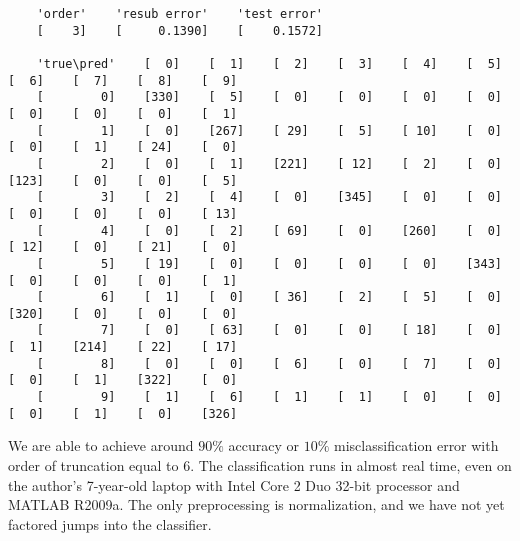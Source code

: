 \documentclass[fleqn]{article}
\theoremstyle{definition}
\theoremstyle{remark}
\begin{document}
\begin{verbatim}
    'order'    'resub error'    'test error'
    [    3]    [     0.1390]    [    0.1572]

    'true\pred'    [  0]    [  1]    [  2]    [  3]    [  4]    [  5]    [  6]    [  7]    [  8]    [  9]
    [        0]    [330]    [  5]    [  0]    [  0]    [  0]    [  0]    [  0]    [  0]    [  0]    [  1]
    [        1]    [  0]    [267]    [ 29]    [  5]    [ 10]    [  0]    [  0]    [  1]    [ 24]    [  0]
    [        2]    [  0]    [  1]    [221]    [ 12]    [  2]    [  0]    [123]    [  0]    [  0]    [  5]
    [        3]    [  2]    [  4]    [  0]    [345]    [  0]    [  0]    [  0]    [  0]    [  0]    [ 13]
    [        4]    [  0]    [  2]    [ 69]    [  0]    [260]    [  0]    [ 12]    [  0]    [ 21]    [  0]
    [        5]    [ 19]    [  0]    [  0]    [  0]    [  0]    [343]    [  0]    [  0]    [  0]    [  1]
    [        6]    [  1]    [  0]    [ 36]    [  2]    [  5]    [  0]    [320]    [  0]    [  0]    [  0]
    [        7]    [  0]    [ 63]    [  0]    [  0]    [ 18]    [  0]    [  1]    [214]    [ 22]    [ 17]
    [        8]    [  0]    [  0]    [  6]    [  0]    [  7]    [  0]    [  0]    [  1]    [322]    [  0]
    [        9]    [  1]    [  6]    [  1]    [  1]    [  0]    [  0]    [  0]    [  1]    [  0]    [326]
\end{verbatim}

We are able to achieve around $90\%$ accuracy or $10\%$ misclassification error with order of truncation equal to 6. The classification runs in almost real time, even on the author's 7-year-old laptop with Intel Core 2 Duo 32-bit processor and MATLAB R2009a. The only preprocessing is normalization, and we have not yet factored jumps into the classifier.


\end{document}
